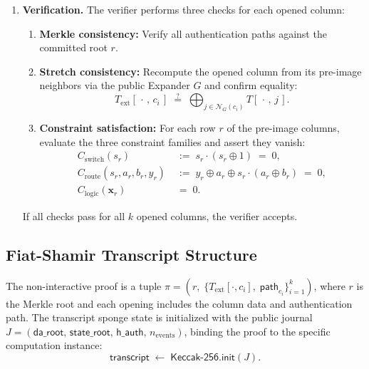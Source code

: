 \documentclass[11pt,a4paper]{article}
\begin{document}
\begin{enumerate}[label=\textbf{Phase \arabic*.},leftmargin=*]
\item \textbf{Verification.}
The verifier performs three checks for each opened column:

\begin{enumerate}[label=(\alph*)]
  \item \textbf{Merkle consistency:} Verify all authentication
        paths against the committed root $r$.
  \item \textbf{Stretch consistency:} Recompute the opened
        column from its pre-image neighbors via the public
        Expander $G$ and confirm equality:
        \[
          T_{\mathrm{ext}}[\,\cdot\,,\, c_i\,]
          \;\stackrel{?}{=}\;
          \bigoplus_{j \in \mathcal{N}_G(c_i)} T[\,\cdot\,,\, j\,].
        \]
  \item \textbf{Constraint satisfaction:} For each row $r$ of
        the pre-image columns, evaluate the three constraint
        families and assert they vanish:
        \begin{align}
          C_{\mathrm{switch}}(s_r)
            &\;:=\; s_r \cdot (s_r \oplus 1)
            \;=\; 0, \label{eq:switch-proto} \\
          C_{\mathrm{route}}(s_r, a_r, b_r, y_r)
            &\;:=\; y_r \oplus a_r \oplus s_r \cdot
                    (a_r \oplus b_r)
            \;=\; 0, \label{eq:route-proto} \\
          C_{\mathrm{logic}}(\mathbf{x}_r)
            &\;=\; 0. \label{eq:logic-proto}
        \end{align}
\end{enumerate}
If all checks pass for all $k$ opened columns, the verifier
accepts.

\end{enumerate}

\subsection{Fiat-Shamir Transcript Structure}

The non-interactive proof is a tuple
$\pi = (r,\; \{T_{\mathrm{ext}}[\cdot, c_i],\;
\mathsf{path}_{c_i}\}_{i=1}^{k})$,
where $r$ is the Merkle root and each opening includes the
column data and authentication path.  The transcript sponge
state is initialized with the public journal
$J = (\mathsf{da\_root},\, \mathsf{state\_root},\,
\mathsf{h\_auth},\, n_{\mathrm{events}})$, binding the proof
to the specific computation instance:
\[
  \mathsf{transcript}
  \;\leftarrow\;
  \mathsf{Keccak\text{-}256}.\mathsf{init}(J).
\]
\end{document}
